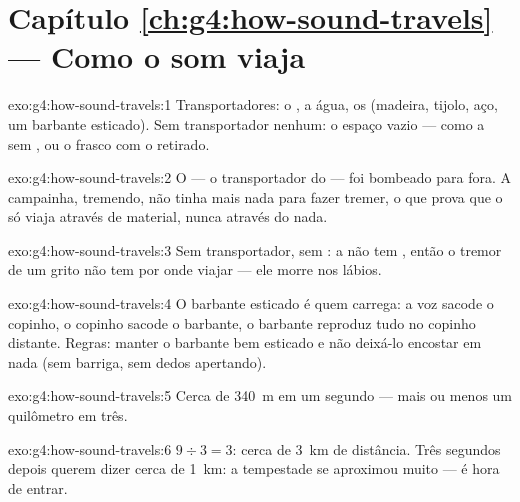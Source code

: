 \section*{Capítulo \ref{ch:g4:how-sound-travels} --- Como o som viaja}

\begin{solution}{exo:g4:how-sound-travels:1}
Transportadores: o , a água, os  (madeira, tijolo, aço, um
barbante esticado). Sem transportador nenhum: o espaço vazio --- como
a  sem , ou o frasco com o  retirado.
\end{solution}

\begin{solution}{exo:g4:how-sound-travels:2}
O  --- o transportador do  --- foi bombeado para fora. A
campainha, tremendo, não tinha mais nada para fazer tremer, o que
prova que o  só viaja através de material, nunca através do nada.
\end{solution}

\begin{solution}{exo:g4:how-sound-travels:3}
Sem transportador, sem : a  não tem , então o tremor de um
grito não tem por onde viajar --- ele morre nos lábios.
\end{solution}

\begin{solution}{exo:g4:how-sound-travels:4}
O barbante esticado é quem carrega: a voz sacode o copinho, o
copinho sacode o barbante, o barbante reproduz tudo no copinho
distante. Regras: manter o barbante bem esticado e não deixá-lo
encostar em nada (sem barriga, sem dedos apertando).
\end{solution}

\begin{solution}{exo:g4:how-sound-travels:5}
Cerca de \qty{340}{m} em um segundo --- mais ou menos um quilômetro
em três.
\end{solution}

\begin{solution}{exo:g4:how-sound-travels:6}
$9 \div 3 = 3$: cerca de \qty{3}{km} de distância. Três segundos
depois querem dizer cerca de \qty{1}{km}: a tempestade se aproximou
muito --- é hora de entrar.
\end{solution}

